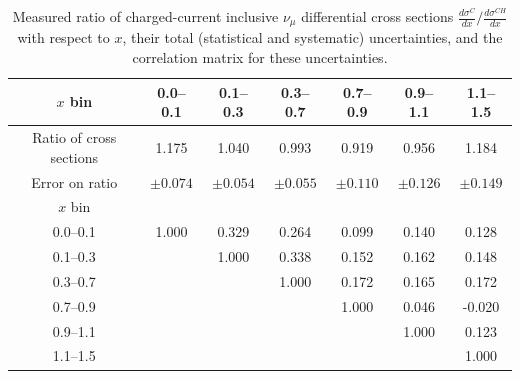 \documentclass[aps,preprint,showpacs,superscriptaddress]{revtex4} %
\newcommand{\numu}{\ensuremath{\nu_{\mu}}\xspace}
\newcommand{\Xbj}{\ensuremath{x}\xspace}
\begin{document}
\begingroup
\squeezetable
\begin{table}
  \begin{tabular}{c|cccccc}
    \hline \hline
    \Xbj bin & 0.0--0.1 & 0.1--0.3 & 0.3--0.7 & 0.7--0.9 & 0.9--1.1 & 1.1--1.5 \\ 
    \hline
    Ratio of cross sections & 1.175 & 1.040 & 0.993 & 0.919 & 0.956 & 1.184 \\ 
    Error on ratio & $ \pm 0.074 $ & $ \pm 0.054 $ & $ \pm 0.055 $ & $ \pm 0.110 $ & $ \pm 0.126 $ & $ \pm 0.149 $ \\ 
    \hline
    \Xbj bin &  &  &  &  &  &  \\ 
    0.0--0.1 & 1.000 & 0.329 & 0.264 & 0.099 & 0.140 & 0.128 \\ 
    0.1--0.3 &  & 1.000 & 0.338 & 0.152 & 0.162 & 0.148 \\ 
    0.3--0.7 &  &  & 1.000 & 0.172 & 0.165 & 0.172 \\ 
    0.7--0.9 &  &  &  & 1.000 & 0.046 & -0.020 \\ 
    0.9--1.1 &  &  &  &  & 1.000 & 0.123 \\ 
    1.1--1.5 &  &  &  &  &  & 1.000 \\ 
    \hline \hline
  \end{tabular}
  \caption{Measured ratio of charged-current inclusive \numu differential cross sections $\frac{d\sigma^{C}}{d\Xbj}/\frac{d\sigma^{CH}}{d\Xbj}$ with respect to \Xbj, their total (statistical and systematic) uncertainties, and the correlation matrix for these uncertainties.}
  \label{tab:x_ratio_06_91_results_table}
\end{table}
\endgroup
\end{document}

